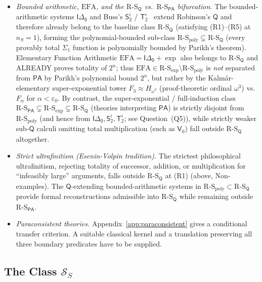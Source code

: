 \documentclass[11pt]{article}
\theoremstyle{plain}
\theoremstyle{definition}
\newcommand{\RS}{\mathrm{R\text{-}S}}
\newcommand{\cS}{\mathcal{S}}
\newcommand{\PA}{\mathsf{PA}}
\begin{document}
\begin{itemize}
\item \emph{Bounded arithmetic, $\mathrm{EFA}$, and the $\RS_{\mathsf{Q}}$ vs.\ $\RS_{\PA}$ bifurcation.} The bounded-arithmetic systems $\mathsf{I\Delta_0}$ and Buss's $\mathsf{S}_2^i$ / $\mathsf{T}_2^i$~\cite{Buss1986} extend Robinson's $\mathsf{Q}$ and therefore already belong to the baseline class $\RS_{\mathsf{Q}}$ (satisfying (R1)--(R5) at $n_S = 1$), forming the polynomial-bounded sub-class $\RS_{\mathrm{poly}} \subsetneq \RS_{\mathsf{Q}}$ (every provably total $\Sigma_1$ function is polynomially bounded by Parikh's theorem). Elementary Function Arithmetic $\mathrm{EFA} = \mathsf{I\Delta_0} + \exp$ also belongs to $\RS_{\mathsf{Q}}$ and ALREADY proves totality of $2^n$; thus $\mathrm{EFA} \in \RS_{\exp} \setminus \RS_{\mathrm{poly}}$ is \emph{not} separated from $\PA$ by Parikh's polynomial bound $2^n$, but rather by the Kalm\'ar-elementary super-exponential tower $F_3 \approx H_{\omega^3}$ (proof-theoretic ordinal $\omega^3$) vs.\ $F_\alpha$ for $\alpha < \varepsilon_0$. By contrast, the super-exponential / full-induction class $\RS_{\PA} \subsetneq \RS_{\exp} \subsetneq \RS_{\mathsf{Q}}$ (theories interpreting $\PA$) is strictly disjoint from $\RS_{\mathrm{poly}}$ (and hence from $\mathsf{I\Delta_0}, \mathsf{S}_2^i, \mathsf{T}_2^i$; see Question~(Q5)), while strictly weaker sub-$\mathsf{Q}$ calculi omitting total multiplication (such as $\mathsf{V}_0$) fall outside $\RS_{\mathsf{Q}}$ altogether.
\item \emph{Strict ultrafinitism (Esenin-Volpin tradition).} The strictest philosophical ultrafinitism, rejecting totality of successor, addition, or multiplication for ``infeasibly large'' arguments, falls outside $\RS_{\mathsf{Q}}$ at (R1) (above, Non-examples). The $\mathsf{Q}$-extending bounded-arithmetic systems in $\RS_{\mathrm{poly}} \subset \RS_{\mathsf{Q}}$ provide formal reconstructions admissible into $\RS_{\mathsf{Q}}$ while remaining outside $\RS_{\PA}$.
\item \emph{Paraconsistent theories.} Appendix~\ref{app:paraconsistent} gives a conditional transfer criterion. A suitable classical kernel and a translation preserving all three boundary predicates have to be supplied.
\end{itemize}

\subsection{\texorpdfstring{The Class $\cS_S$}{The Class S\_S}}
\end{document}
